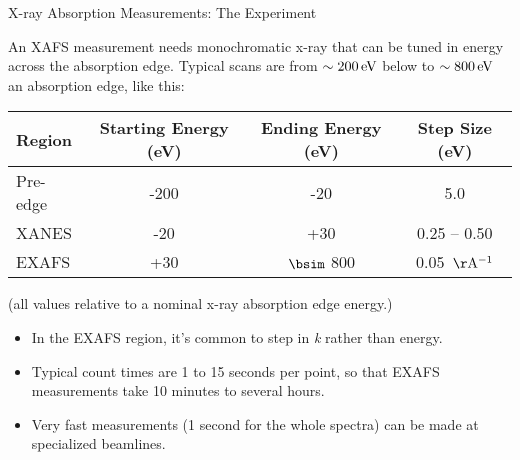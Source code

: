 
\begin{slide}{X-ray Absorption Measurements: The Experiment}

An XAFS measurement needs monochromatic x-ray that can be tuned in energy
across the absorption edge.  Typical scans are from ${\sim 200\rm\,eV}$
below to ${\sim 800\rm\, eV}$ an absorption edge, like this:
\vspace{2mm}
      
  \begin{center}
    \begin{tabular}{|lccc|}
      \hline
      Region & Starting Energy (eV)& Ending Energy (eV)& Step Size (eV)\\
      \hline
      Pre-edge     & -200 &   -20    &    5.0 \\
      XANES        & -20  &   +30    &    0.25 -- 0.50 \\
      EXAFS        & +30  &  $\bsim$ 800 &  0.05   ${\rm\,\AA^{-1}}$\\
      \hline
    \end{tabular} 
  \end{center}
  (all values relative to a nominal x-ray absorption edge energy.)
  \pause
  \vmm
  \begin{itemize}
  \item In the EXAFS region, it's common to step in {\slshape{k}}
    rather than energy.
  \item Typical count times are 1 to 15 seconds per point, so that
    EXAFS measurements take 10 minutes to several hours.
    
  \item Very fast measurements (1 second for the whole spectra) can
    be made at specialized beamlines.
   
  \end{itemize}

\vfill
\end{slide} 
